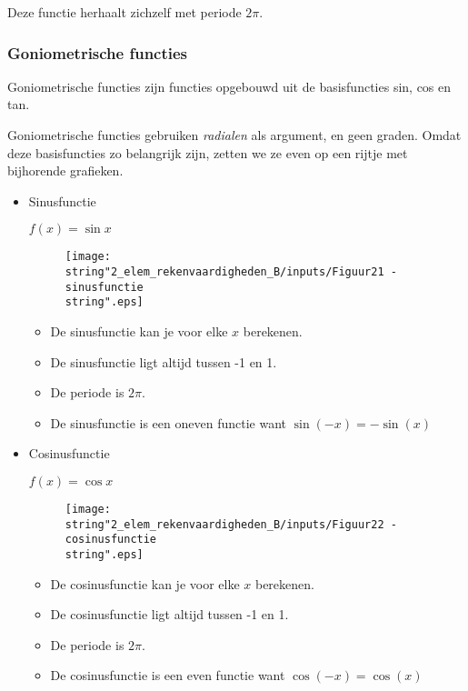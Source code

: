 \noindent Deze functie herhaalt zichzelf met periode $2\pi$.


\subsubsection{Goniometrische functies}

\noindent Goniometrische functies zijn functies opgebouwd uit de basisfuncties
sin, cos en tan.

\noindent Goniometrische functies gebruiken \emph{radialen} als argument,
en geen graden. Omdat deze basisfuncties zo belangrijk zijn, zetten
we ze even op een rijtje met bijhorende grafieken. 

\begin{itemize}
\item{Sinusfunctie}

$f(x)=\sin x$

\noindent 
\begin{figure}[h]
	\centering{}\texttt{[image: \\string"2\_elem\_rekenvaardigheden\_B/inputs/Figuur21 - sinusfunctie\\string".eps]} 
\end{figure}

\begin{itemize}
	\item De sinusfunctie kan je voor elke $x$ berekenen. 
	\item De sinusfunctie ligt altijd tussen -1 en 1.
	\item De periode is $2\pi$. 
	\item De sinusfunctie is een oneven functie want $\sin(-x)=-\sin(x)$
\end{itemize}

\item{Cosinusfunctie}

$f(x)=\cos x$

\noindent 
\begin{figure}[h]
	\centering{}\texttt{[image: \\string"2\_elem\_rekenvaardigheden\_B/inputs/Figuur22 - cosinusfunctie\\string".eps]} 
\end{figure}

\begin{itemize}
	\item De cosinusfunctie kan je voor elke $x$ berekenen. 
	\item De cosinusfunctie ligt altijd tussen -1 en 1.
	\item De periode is $2\pi$. 
	\item De cosinusfunctie is een even functie want $\cos(-x)=\cos(x)$
\end{itemize}


\end{itemize}
